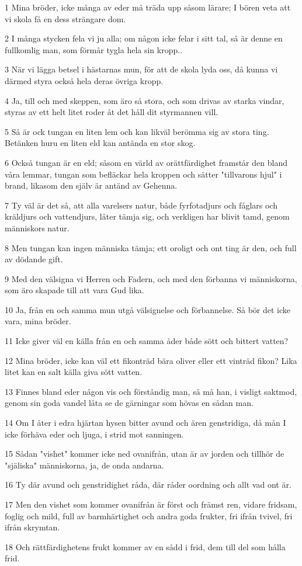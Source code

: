 \par 1 Mina bröder, icke många av eder må träda upp såsom lärare; I bören veta att vi skola få en dess strängare dom.
\par 2 I många stycken fela vi ju alla; om någon icke felar i sitt tal, så är denne en fullkomlig man, som förmår tygla hela sin kropp..
\par 3 När vi lägga betsel i hästarnas mun, för att de skola lyda oss, då kunna vi därmed styra också hela deras övriga kropp.
\par 4 Ja, till och med skeppen, som äro så stora, och som drivas av starka vindar, styras av ett helt litet roder åt det håll dit styrmannen vill.
\par 5 Så är ock tungan en liten lem och kan likväl berömma sig av stora ting. Betänken huru en liten eld kan antända en stor skog.
\par 6 Också tungan är en eld; såsom en värld av orättfärdighet framstår den bland våra lemmar, tungan som befläckar hela kroppen och sätter "tillvarons hjul" i brand, likasom den själv är antänd av Gehenna.
\par 7 Ty väl är det så, att alla varelsers natur, både fyrfotadjurs och fåglars och kräldjurs och vattendjurs, låter tämja sig, och verkligen har blivit tamd, genom människors natur.
\par 8 Men tungan kan ingen människa tämja; ett oroligt och ont ting är den, och full av dödande gift.
\par 9 Med den välsigna vi Herren och Fadern, och med den förbanna vi människorna, som äro skapade till att vara Gud lika.
\par 10 Ja, från en och samma mun utgå välsignelse och förbannelse. Så bör det icke vara, mina bröder.
\par 11 Icke giver väl en källa från en och samma åder både sött och bittert vatten?
\par 12 Mina bröder, icke kan väl ett fikonträd bära oliver eller ett vinträd fikon? Lika litet kan en salt källa giva sött vatten.
\par 13 Finnes bland eder någon vis och förståndig man, så må han, i visligt saktmod, genom sin goda vandel låta se de gärningar som hövas en sådan man.
\par 14 Om I åter i edra hjärtan hysen bitter avund och ären genstridiga, då mån I icke förhäva eder och ljuga, i strid mot sanningen.
\par 15 Sådan "vishet" kommer icke ned ovanifrån, utan är av jorden och tillhör de "själiska" människorna, ja, de onda andarna.
\par 16 Ty där avund och genstridighet råda, där råder oordning och allt vad ont är.
\par 17 Men den vishet som kommer ovanifrån är först och främst ren, vidare fridsam, foglig och mild, full av barmhärtighet och andra goda frukter, fri ifrån tvivel, fri ifrån skrymtan.
\par 18 Och rättfärdighetens frukt kommer av en sådd i frid, dem till del som hålla frid.

